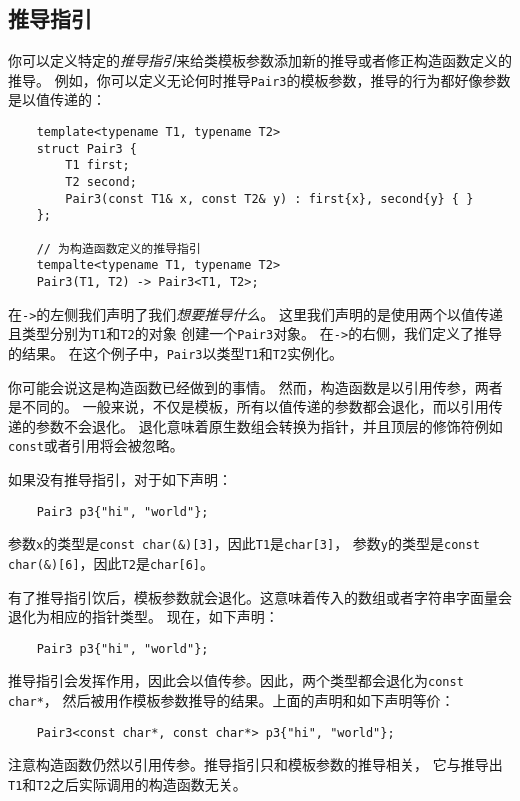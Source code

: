\subsection{推导指引}\label{ch9.2}
你可以定义特定的\emph{推导指引}来给类模板参数添加新的推导或者修正构造函数定义的推导。
例如，你可以定义无论何时推导\texttt{Pair3}的模板参数，推导的行为都好像参数是以值传递的：
\begin{lstlisting}
    template<typename T1, typename T2>
    struct Pair3 {
        T1 first;
        T2 second;
        Pair3(const T1& x, const T2& y) : first{x}, second{y} { }
    };

    // 为构造函数定义的推导指引
    tempalte<typename T1, typename T2>
    Pair3(T1, T2) -> Pair3<T1, T2>;
\end{lstlisting}
在\texttt{->}的左侧我们声明了我们\emph{想要推导什么}。
这里我们声明的是使用两个以值传递且类型分别为\texttt{T1}和\texttt{T2}的对象
创建一个\texttt{Pair3}对象。
在\texttt{->}的右侧，我们定义了推导的结果。
在这个例子中，\texttt{Pair3}以类型\texttt{T1}和\texttt{T2}实例化。

你可能会说这是构造函数已经做到的事情。
然而，构造函数是以引用传参，两者是不同的。
一般来说，不仅是模板，所有以值传递的参数都会退化，而以引用传递的参数不会退化。
退化意味着原生数组会转换为指针，并且顶层的修饰符例如\texttt{const}或者引用将会被忽略。

如果没有推导指引，对于如下声明：
\begin{lstlisting}
    Pair3 p3{"hi", "world"};
\end{lstlisting}
参数\texttt{x}的类型是\texttt{const char(\&)[3]}，因此\texttt{T1}是\texttt{char[3]}，
参数\texttt{y}的类型是\texttt{const char(\&)[6]}，因此\texttt{T2}是\texttt{char[6]}。

有了推导指引饮后，模板参数就会退化。这意味着传入的数组或者字符串字面量会退化为相应的指针类型。
现在，如下声明：
\begin{lstlisting}
    Pair3 p3{"hi", "world"};
\end{lstlisting}
推导指引会发挥作用，因此会以值传参。因此，两个类型都会退化为\texttt{const char*}，
然后被用作模板参数推导的结果。上面的声明和如下声明等价：
\begin{lstlisting}
    Pair3<const char*, const char*> p3{"hi", "world"};
\end{lstlisting}
注意构造函数仍然以引用传参。推导指引只和模板参数的推导相关，
它与推导出\texttt{T1}和\texttt{T2}之后实际调用的构造函数无关。

